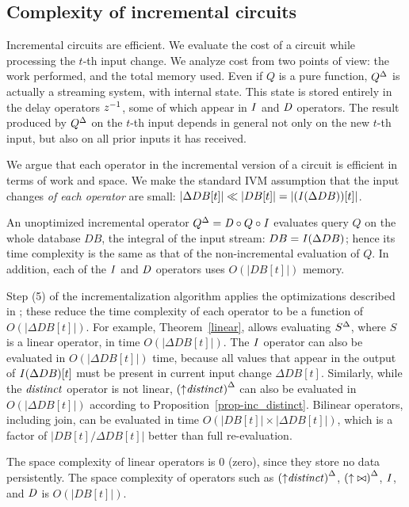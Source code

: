 
\subsection{Complexity of incremental circuits}\label{sec:complexity}

Incremental circuits are efficient.  We evaluate the cost of a circuit
while processing the $t$-th input change.  We analyze cost from two
points of view: the work performed, and the total memory used.  Even
if $Q$ is a pure function, ${Q}^{\Delta}$ is actually a streaming system,
with internal state.  This state is stored entirely in the delay
operators $z^{-1}$, some of which appear in $\mathit{I}$ and $\mathit{D}$ operators.  The
result produced by ${Q}^{\Delta}$ on the $t$-th input depends in general
not only on the new $t$-th input, but also on all prior inputs it has
received.

We argue that each operator in the incremental version of a circuit is
efficient in terms of work and space.  We make the standard IVM
assumption that the input changes \emph{of each operator} are small:
$|\Delta DB[t]| \ll |DB[t]| = |(\mathit{I}(\Delta DB))[t]|$.

An unoptimized incremental operator ${Q}^{\Delta} = \mathit{D} \circ Q \circ \mathit{I}$
evaluates query $Q$ on the whole database $DB$, the integral of the input stream:
$DB = \mathit{I}(\Delta DB)$; hence its time complexity  is the same as that of the non-incremental
evaluation of $Q$.  In addition, each of the $\mathit{I}$ and $\mathit{D}$ operators uses $O(|DB[t]|)$ memory.

Step (5) of the incrementalization algorithm applies the optimizations described in ;
these reduce the time complexity of each operator to be a function of $O(|\Delta DB[t]|)$.
For example, Theorem~\ref{linear}, allows evaluating ${S}^{\Delta}$, where $S$ is a
linear operator, in time $O(|\Delta DB[t]|)$.  The $\mathit{I}$
operator can also be evaluated in $O(|\Delta DB[t]|)$ time, because
all values that appear in the output of $\mathit{I}(\Delta DB)[t]$ must be present in
current input change $\Delta DB[t]$.  Similarly, while the $\mathit{distinct}$ operator is not
linear, ${({\uparrow}\mathit{distinct})}^{\Delta}$ can also be evaluated in $O(|\Delta DB[t]|)$ according to
Proposition~\ref{prop-inc_distinct}.  Bilinear operators, including join, can be
evaluated in time $O(|DB[t]| \times |\Delta DB[t]|)$, which is a factor of $|DB[t] / \Delta DB[t]|$
better than full re-evaluation.

The space complexity of linear operators is 0 (zero), since they store no
data persistently.  The space complexity of operators such as ${({\uparrow}\mathit{distinct})}^{\Delta}$,
${({\uparrow}\bowtie)}^{\Delta}$, $\mathit{I}$, and $\mathit{D}$ is $O(|DB[t]|)$.


